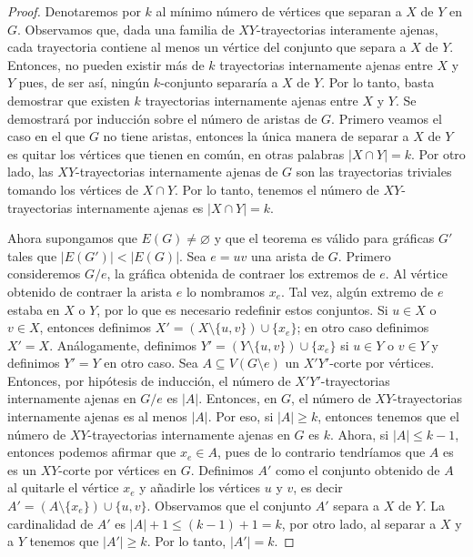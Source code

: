 \begin{proof}
    Denotaremos por $k$ al m\'inimo n\'umero de v\'ertices que separan a $X$ de
    $Y$ en $G$. Observamos que, dada una familia de $XY$-trayectorias
    interamente ajenas, cada trayectoria contiene al menos un v\'ertice del
    conjunto que separa a $X$ de $Y$. Entonces, no pueden existir m\'as de $k$
    trayectorias internamente ajenas entre $X$ y $Y$ pues, de ser as\'i,
    ning\'un $k$-conjunto separar\'ia a $X$ de $Y$. Por lo tanto, basta
    demostrar que existen $k$ trayectorias internamente ajenas entre $X$ y $Y$.
    Se demostrar\'a por inducci\'on sobre el n\'umero de aristas de $G$. Primero
    veamos el caso en el que $G$ no tiene aristas, entonces la \'unica manera de
    separar a $X$ de $Y$ es quitar los v\'ertices que tienen en com\'un, en
    otras palabras $|X \cap Y|=k$. Por otro lado, las $XY$-trayectorias
    internamente ajenas de $G$ son las trayectorias triviales tomando los
    v\'ertices de $X \cap Y$. Por lo tanto, tenemos el n\'umero de
    $XY$-trayectorias internamente ajenas es $|X\cap Y|=k$.

    Ahora supongamos que $E(G) \neq \varnothing$ y que el teorema es
    v\'alido para gr\'aficas $G'$ tales que $|E(G')| < |E(G)|$. Sea $e = uv$ una
    arista de $G$. Primero consideremos $G/e$, la gr\'afica obtenida de contraer
    los extremos de $e$. Al v\'ertice obtenido de contraer la arista $e$ lo
    nombramos $x_e$. Tal vez, alg\'un extremo de $e$ estaba en $X$ o $Y$, por lo
    que es necesario redefinir estos conjuntos. Si $u\in X$ o $v\in X$, entonces
    definimos $X'=(X \setminus \{u,v\}) \cup \{x_e\}$; en otro caso definimos
    $X'=X$. An\'alogamente, definimos $Y'= (Y \setminus \{u,v\}) \cup \{x_e\}$
    si $u \in Y$ o $v \in Y$ y definimos $Y'=Y$ en otro caso. Sea $A \subseteq
    V(G \setminus e)$ un $X'Y'$-corte por v\'ertices. Entonces, por hip\'otesis
    de inducci\'on, el n\'umero de $X'Y'$-trayectorias internamente ajenas en
    $G/e$ es $|A|$. Entonces, en $G$, el n\'umero de $XY$-trayectorias
    internamente ajenas es al menos $|A|$. Por eso, si $|A| \geq k$, entonces
    tenemos que el n\'umero de $XY$-trayectorias internamente ajenas en $G$ es
    $k$. Ahora, si $|A| \leq k-1$, entonces podemos afirmar que $x_e \in A$,
    pues de lo contrario tendr\'iamos que $A$ es es un $XY$-corte por v\'ertices
    en $G$. Definimos $A'$ como el conjunto obtenido de $A$ al quitarle el
    v\'ertice $x_e$ y a\~{n}adirle los v\'ertices $u$ y $v$, es decir $A'=(A
    \setminus \{x_e\})\cup \{u,v\}$. Observamos que el conjunto $A'$ separa  a
    $X$ de $Y$. La cardinalidad de $A'$ es $|A|+1 \leq (k-1)+1= k$, por otro
    lado, al separar a $X$ y a $Y$ tenemos que $|A'| \geq k$. Por lo tanto,
    $|A'|=k$.


\end{proof}

